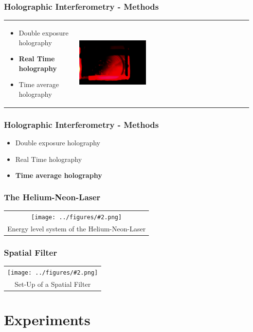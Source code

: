 \documentclass{beamer}
\newcommand{\gra}[3][]{
	\begin{table}
	\centering
	\begin{tabular}[width=\textwidth]{c}
		\texttt{[image: ../figures/\#2.png]}\\
		\small #3
	\end{tabular}
	\end{table}
}
\begin{document}
\begin{frame}
	\frametitle{Holographic Interferometry - Methods}
		\begin{table}
			\centering
			\begin{tabular}[width=\textwidth]{m{6cm}m{4cm}}
	\begin{itemize}
		\item Double exposure holography
		\item \textbf{Real Time holography}
		\item Time average holography
	\end{itemize}
				&
				\includegraphics[width=0.4\textwidth]{../figures/aluminium2_edit.png}
			\end{tabular}
		\end{table}

\end{frame}
\begin{frame}
	\frametitle{Holographic Interferometry - Methods}
	\begin{itemize}
		\item Double exposure holography
		\item Real Time holography
		\item \textbf{Time average holography}
	\end{itemize}
\end{frame}
\begin{frame}
	\frametitle{The Helium-Neon-Laser}
 \gra[0.5]{HeNe}{Energy level system of the Helium-Neon-Laser \footnotemark}
\end{frame}
\begin{frame}
	\frametitle{Spatial Filter}
	\gra[0.8]{SpatialFilter}{Set-Up of a Spatial Filter }
\end{frame}

\section{Experiments}
\frame{\tableofcontents[currentsection]}
\end{document}

